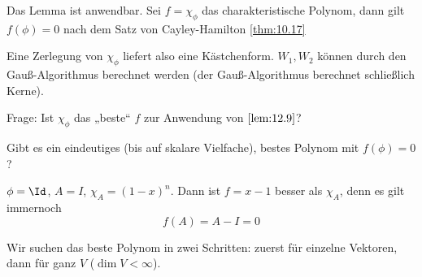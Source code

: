 \documentclass[a4paper, 10pt]{scrbook}
\begin{document}
Das Lemma ist anwendbar.
Sei $f=\chi_\phi$ das charakteristische Polynom,
dann gilt $f(\phi)=0$ nach dem Satz von Cayley-Hamilton \ref{thm:10.17}

Eine Zerlegung von $\chi_\phi$ liefert also eine Kästchenform.
$W_1,W_2$ können durch den Gauß-Algorithmus berechnet werden (der Gauß-Algorithmus berechnet schließlich Kerne).

Frage: Ist $\chi_\phi$ das „beste“ $f$ zur Anwendung von $\ref{lem:12.9}$?

Gibt es ein eindeutiges (bis auf skalare Vielfache), bestes Polynom mit $f(\phi)=0$?
\begin{ex}
$\phi = \Id$, $A=I$, $\chi_A = (1-x)^n$.
Dann ist $f=x-1$ besser als $\chi_A$, denn es gilt immernoch
\[
	f(A)=A-I=0
\]
\end{ex}

Wir suchen das beste Polynom in zwei Schritten:
zuerst für einzelne Vektoren, dann für ganz $V$ ($\dim V<\infty$).
\end{document}
